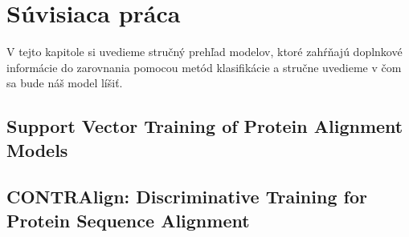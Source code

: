 \chapter{Súvisiaca práca}

V tejto kapitole si uvedieme stručný prehľad modelov, ktoré zahŕňajú doplnkové informácie do zarovnania pomocou metód klasifikácie a stručne uvedieme v čom sa bude náš model líšiť.

\section{Support Vector Training of Protein Alignment Models}

\section{CONTRAlign: Discriminative Training for Protein Sequence Alignment}
